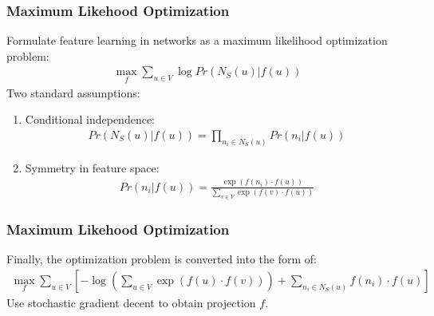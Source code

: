 \documentclass[notes, 10pt, aspectratio=169]{beamer}
\begin{document}
\begin{frame}
    \frametitle{Maximum Likehood Optimization}
    Formulate feature learning in networks as a maximum likelihood optimization problem:
    \begin{align*}
        \max_{f} \sum_{u\in V} \log Pr\left( N_S\left( u \right)|f(u)  \right) 
    \end{align*}
    Two standard assumptions:
    \begin{enumerate}
        \item Conditional independence:
            \begin{align*}
                Pr\left( N_S\left( u \right)| f\left( u \right)  \right) = \prod_{n_i\in N_S\left( u \right) }Pr\left( n_i|f(u) \right) 
            \end{align*}
        \item Symmetry in feature space:
            \begin{align*}
                Pr\left( n_i|f\left( u \right)  \right) = \frac{\exp\left( f\left( n_i \right) \cdot f\left( u \right)  \right) }{\sum_{v\in V}\exp\left( f\left( v \right)\cdot f\left( u \right)   \right)} 
            \end{align*}
    \end{enumerate}
\end{frame}

\begin{frame}
    \frametitle{Maximum Likehood Optimization}
    Finally, the optimization problem is converted into the form of:
    \begin{align*}
        \max_f \sum_{u\in V} \left[ -\log\left( \sum_{u\in V}\exp\left( f(u)\cdot f(v) \right)  \right) + \sum_{n_i\in N_S(u)} f(n_i)\cdot f(u) \right] 
    \end{align*}
    Use stochastic gradient decent to obtain projection $f$.
\end{frame}
\end{document}
